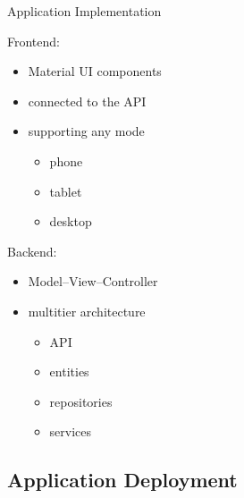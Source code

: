 \documentclass[]{beamer}
\begin{document}
    \begin{frame}{Application Implementation}
       \setlength{\columnsep}{-10mm}
      \begin{adjustwidth}{7mm}{-8mm}
        \begin{multicols}{2}
          Frontend:
          \begin{itemize}
            \item Material UI components
            \item connected to the API
            \item supporting any mode
            \begin{itemize}
              \item phone
              \item tablet
              \item desktop
            \end{itemize}
          \end{itemize}

          \columnbreak

          Backend:
          \begin{itemize}
            \item Model--View--Controller
            \item multitier architecture
            \begin{itemize}
              \item API
              \item entities
              \item repositories
              \item services
            \end{itemize}
          \end{itemize}
        \end{multicols}
      \end{adjustwidth}
    \end{frame}

  \subsection{Application Deployment}
\end{document}
